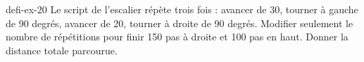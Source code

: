 \begin{blocEdition}{defi-ex-20}
Le script de l’escalier répète trois fois : avancer de 30, tourner à gauche de 90 degrés, avancer de 20, tourner à droite de 90 degrés. Modifier seulement le nombre de répétitions pour finir 150 pas à droite et 100 pas en haut. Donner la distance totale parcourue.\label{fig-defi-20}
\par{}\par\par{}\par{}\par{}\par{}\par{}\par{}
\end{blocEdition}
